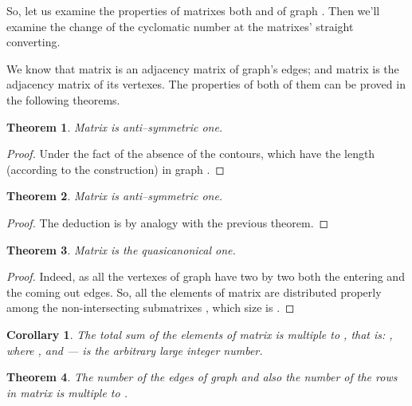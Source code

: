 \documentclass{amsart}
\newtheorem{theorem}{Theorem}
\theoremstyle{plain}
\newtheorem{corollary}{Corollary}
\numberwithin{equation}{section}
\begin{document}
So, let us examine the properties of matrixes both  and  of graph .
Then we'll examine the change of the cyclomatic number at the matrixes'  straight converting.

We know that matrix  is an adjacency matrix of graph's  edges; and matrix  is the adjacency matrix of its vertexes. The properties of both of them can be proved in the following theorems.

\begin{theorem}
Matrix  is anti--symmetric one.
\end {theorem}

\begin {proof}
Under the fact of the absence of the contours, which have the length  (according to the construction) in graph .
\end {proof}

\begin {theorem}
Matrix  is anti--symmetric one.
\end {theorem}

\begin {proof}
The deduction is by analogy with the previous theorem.
\end {proof}

\begin {theorem}
Matrix  is the quasicanonical one.
\end {theorem}

\begin {proof}
Indeed, as all the vertexes  of graph  have two by two both the entering and the coming out edges. So, all the elements  of matrix  are distributed properly among the non-intersecting submatrixes , which size is  \cite {Malinin}.
\end {proof}

\begin {corollary}
The total sum of the elements  of matrix  is multiple to , that is: , where , and  --- is the arbitrary large integer number.
\end {corollary}

\begin {theorem} \label{MatrixRedges}
The number of the edges  of graph  and also the number of the rows in matrix  is multiple to .
\end {theorem}
\end{document}
